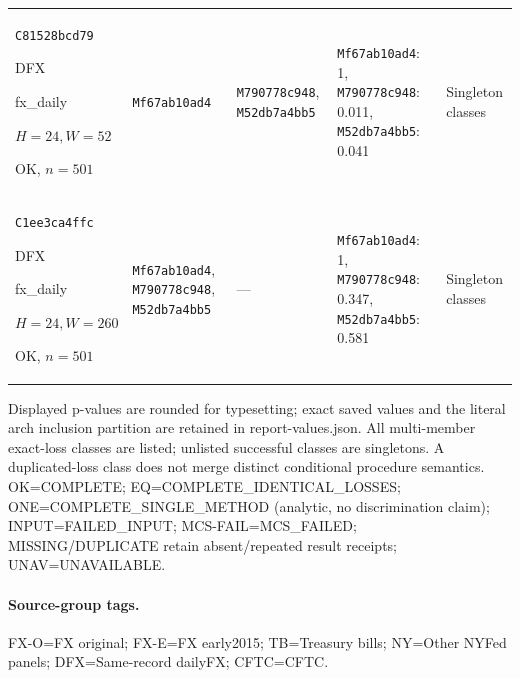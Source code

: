 \begin{longtable}{p{.15\linewidth}p{.17\linewidth}p{.17\linewidth}p{.25\linewidth}p{.14\linewidth}}
\texttt{C81528bcd79}\par DFX\par fx\_\allowbreak{}daily\par $H=24,W=52$\par OK, $n=501$ & \texttt{Mf67ab10ad4} & \texttt{M790778c948}, \texttt{M52db7a4bb5} & \texttt{Mf67ab10ad4}: 1, \texttt{M790778c948}: 0.011, \texttt{M52db7a4bb5}: 0.041 & Singleton classes \\
\texttt{C1ee3ca4ffc}\par DFX\par fx\_\allowbreak{}daily\par $H=24,W=260$\par OK, $n=501$ & \texttt{Mf67ab10ad4}, \texttt{M790778c948}, \texttt{M52db7a4bb5} & --- & \texttt{Mf67ab10ad4}: 1, \texttt{M790778c948}: 0.347, \texttt{M52db7a4bb5}: 0.581 & Singleton classes \\
\end{longtable}
\endgroup
\begingroup

\noindent\footnotesize Displayed p-values are rounded for typesetting; exact saved values and the literal arch inclusion partition are retained in report-values.json. All multi-member exact-loss classes are listed; unlisted successful classes are singletons. A duplicated-loss class does not merge distinct conditional procedure semantics. OK=COMPLETE; EQ=COMPLETE\_IDENTICAL\_LOSSES; ONE=COMPLETE\_SINGLE\_METHOD (analytic, no discrimination claim); INPUT=FAILED\_INPUT; MCS-FAIL=MCS\_FAILED; MISSING/DUPLICATE retain absent/repeated result receipts; UNAV=UNAVAILABLE.

\paragraph{Source-group tags.} FX-O=FX original; FX-E=FX early2015; TB=Treasury bills; NY=Other NYFed panels; DFX=Same-record dailyFX; CFTC=CFTC.

